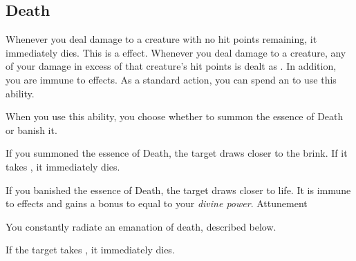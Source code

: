         \subsection{Death}
             Whenever you deal damage to a creature with no hit points remaining, it immediately dies.
            This is a  effect.
             Whenever you deal damage to a creature, any of your damage in excess of that creature's hit points is dealt as .
            In addition, you are immune to  effects.
             As a standard action, you can spend an  to use this ability.
            \begin{ability}
                \begin{spelltargetinginfo}
                    \spellspecial When you use this ability, you choose whether to summon the essence of Death or banish it.
                \end{spelltargetinginfo}
                \begin{spelleffects}
                    \spelleffect If you summoned the essence of Death, the target draws closer to the brink.
                    If it takes , it immediately dies.

                    If you banished the essence of Death, the target draws closer to life.
                    It is immune to  effects and gains a bonus to  equal to your \textit{divine power}.
                    \spelldur Attunement
                \end{spelleffects}
            \end{ability}
             You constantly radiate an emanation of death, described below.
            \begin{ability}
                \begin{spelltargetinginfo}
                \end{spelltargetinginfo}
                \begin{spelleffects}
                    \spelleffect If the target takes , it immediately dies.
                \end{spelleffects}
            \end{ability}


